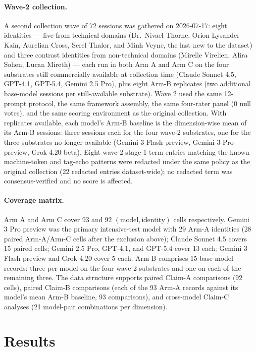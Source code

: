 \documentclass[11pt]{article}
\begin{document}
\paragraph{Wave-2 collection.}
A second collection wave of 72 sessions was gathered on 2026-07-17: eight identities --- five from technical domains (Dr.\ Nivael Thorne, Orion Lysander Kain, Aurelian Cross, Serel Thalor, and Minh Veyne, the last new to the dataset) and three contrast identities from non-technical domains (Mirelle Virelien, Alira Sohen, Lucan Mireth) --- each run in both Arm A and Arm C on the four substrates still commercially available at collection time (Claude Sonnet 4.5, GPT-4.1, GPT-5.4, Gemini 2.5 Pro), plus eight Arm-B replicates (two additional base-model sessions per still-available substrate). Wave 2 used the same 12-prompt protocol, the same framework assembly, the same four-rater panel (0 null votes), and the same scoring environment as the original collection. With replicates available, each model's Arm-B baseline is the dimension-wise mean of its Arm-B sessions: three sessions each for the four wave-2 substrates, one for the three substrates no longer available (Gemini 3 Flash preview, Gemini 3 Pro preview, Grok 4.20 beta). Eight wave-2 stage-1 term entries matching the known machine-token and tag-echo patterns were redacted under the same policy as the original collection (22 redacted entries dataset-wide); no redacted term was consensus-verified and no score is affected.

\paragraph{Coverage matrix.}
Arm A and Arm C cover 93 and 92 $(\text{model}, \text{identity})$ cells respectively. Gemini 3 Pro preview was the primary intensive-test model with 29 Arm-A identities (28 paired Arm-A/Arm-C cells after the exclusion above); Claude Sonnet 4.5 covers 15 paired cells; Gemini 2.5 Pro, GPT-4.1, and GPT-5.4 cover 13 each; Gemini 3 Flash preview and Grok 4.20 cover 5 each. Arm B comprises 15 base-model records: three per model on the four wave-2 substrates and one on each of the remaining three. The data structure supports paired Claim-A comparisons (92 cells), paired Claim-B comparisons (each of the 93 Arm-A records against its model's mean Arm-B baseline, 93 comparisons), and cross-model Claim-C analyses (21 model-pair combinations per dimension).

\section{Results}
\label{sec:results}
\end{document}
